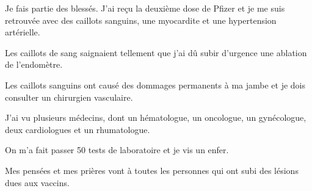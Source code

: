 Je fais partie des blessés. J'ai reçu la deuxième dose de Pfizer et je me suis
retrouvée avec des caillots sanguins, une myocardite et une hypertension
artérielle.

Les caillots de sang saignaient tellement que j'ai dû subir d'urgence une
ablation de l'endomètre.

Les caillots sanguins ont causé des dommages permanents à ma jambe et je dois
consulter un chirurgien vasculaire.

J'ai vu plusieurs médecins, dont un hématologue, un oncologue, un gynécologue,
deux cardiologues et un rhumatologue.

On m'a fait passer 50 tests de laboratoire et je vis un enfer.

Mes pensées et mes prières vont à toutes les personnes qui ont subi des lésions
dues aux vaccins.
